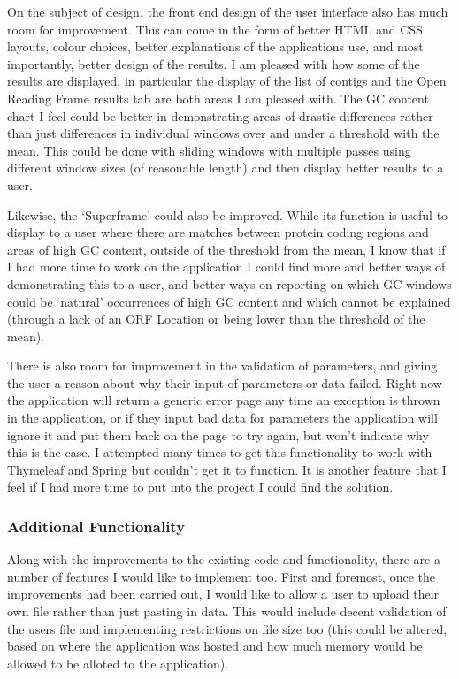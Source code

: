 On the subject of design, the front end design of the user interface also has much room for improvement. This can come in the form of better HTML and CSS layouts, colour choices, better explanations of the applications use, and most importantly, better design of the results. I am pleased with how some of the results are displayed, in particular the display of the list of contigs and the Open Reading Frame results tab are both areas I am pleased with. The GC content chart I feel could be better in demonstrating areas of drastic differences rather than just differences in individual windows over and under a threshold with the mean. This could be done with sliding windows with multiple passes using different window sizes (of reasonable length) and then display better results to a user.

Likewise, the `Superframe' could also be improved. While its function is useful to display to a user where there are matches between protein coding regions and areas of high GC content, outside of the threshold from the mean, I know that if I had more time to work on the application I could find more and better ways of demonstrating this to a user, and better ways on reporting on which GC windows could be `natural' occurrences of high GC content and which cannot be explained (through a lack of an ORF Location or being lower than the threshold of the mean).

There is also room for improvement in the validation of parameters, and giving the user a reason about why their input of parameters or data failed. Right now the application will return a generic error page any time an exception is thrown in the application, or if they input bad data for parameters the application will ignore it and put them back on the page to try again, but won't indicate why this is the case. I attempted many times to get this functionality to work with Thymeleaf and Spring but couldn't get it to function. It is another feature that I feel if I had more time to put into the project I could find the solution.

\subsubsection{Additional Functionality}
Along with the improvements to the existing code and functionality, there are a number of features I would like to implement too. First and foremost, once the improvements had been carried out, I would like to allow a user to upload their own file rather than just pasting in data. This would include decent validation of the users file and implementing restrictions on file size too (this could be altered, based on where the application was hosted and how much memory would be allowed to be alloted to the application).

